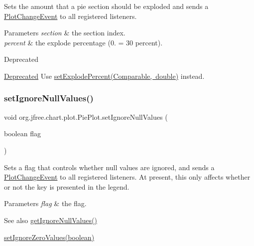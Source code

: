 Sets the amount that a pie section should be exploded and sends a \mbox{\hyperlink{}{Plot\+Change\+Event}} to all registered listeners.


\begin{DoxyParams}{Parameters}
{\em section} & the section index. \\
\hline
{\em percent} & the explode percentage (0. = 30 percent).\\
\hline
\end{DoxyParams}
\begin{DoxyRefDesc}{Deprecated}
\item[\mbox{\hyperlink{deprecated__deprecated000079}{Deprecated}}]Use \mbox{\hyperlink{classorg_1_1jfree_1_1chart_1_1plot_1_1_pie_plot_a1532467123505f9c3fee0171804871fa}{set\+Explode\+Percent(\+Comparable, double)}} instead. \end{DoxyRefDesc}
\mbox{\label{classorg_1_1jfree_1_1chart_1_1plot_1_1_pie_plot_a618349ca4f4880ab09be7e6cb5e5c4af}} 
\subsubsection{\texorpdfstring{set\+Ignore\+Null\+Values()}{setIgnoreNullValues()}}
{\footnotesize\ttfamily void org.\+jfree.\+chart.\+plot.\+Pie\+Plot.\+set\+Ignore\+Null\+Values (\begin{DoxyParamCaption}\item[{boolean}]{flag }\end{DoxyParamCaption})}

Sets a flag that controls whether {\ttfamily null} values are ignored, and sends a \mbox{\hyperlink{}{Plot\+Change\+Event}} to all registered listeners. At present, this only affects whether or not the key is presented in the legend.


\begin{DoxyParams}{Parameters}
{\em flag} & the flag.\\
\hline
\end{DoxyParams}
\begin{DoxySeeAlso}{See also}
\mbox{\hyperlink{classorg_1_1jfree_1_1chart_1_1plot_1_1_pie_plot_ad2449fa76e41a198e1b8900d8277cbd5}{get\+Ignore\+Null\+Values()}} 

\mbox{\hyperlink{classorg_1_1jfree_1_1chart_1_1plot_1_1_pie_plot_a074921a8b902098b95d1be421c523f1b}{set\+Ignore\+Zero\+Values(boolean)}} 
\end{DoxySeeAlso}
\mbox{\label{classorg_1_1jfree_1_1chart_1_1plot_1_1_pie_plot_a074921a8b902098b95d1be421c523f1b}} 
